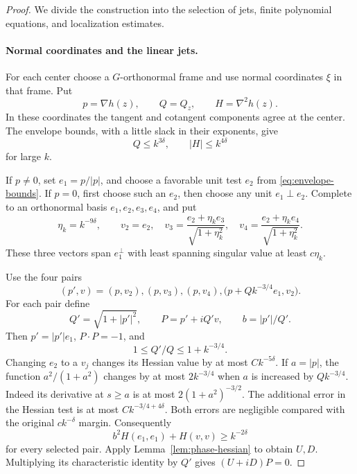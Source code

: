 \begin{proof}
We divide the construction into the selection of jets, finite
polynomial equations, and localization estimates.

\paragraph{Normal coordinates and the linear jets.}
For each center choose a \(G\)-orthonormal frame and use normal
coordinates \(\xi\) in that frame. Put
\[
 p=\nabla h(z),\qquad Q=Q_z,\qquad H=\nabla^2h(z).
\]
In these coordinates the tangent and cotangent components agree at
the center. The envelope bounds, with a little slack in their
exponents, give
\begin{equation}\label{eq:waves-center-bounds}
 Q\le k^{3\delta},\qquad |H|\le k^{4\delta}
\end{equation}
for large \(k\).

If \(p\ne0\), set \(e_1=p/|p|\), and choose a favorable unit test \(e_2\)
from \eqref{eq:envelope-bounds}. If \(p=0\), first choose such an
\(e_2\), then choose any unit \(e_1\perp e_2\).
Complete to an orthonormal basis \(e_1,e_2,e_3,e_4\), and put
\[
 \eta_k=k^{-9\delta},\qquad
 v_2=e_2,\quad
 v_3=\frac{e_2+\eta_k e_3}{\sqrt{1+\eta_k^2}},\quad
 v_4=\frac{e_2+\eta_k e_4}{\sqrt{1+\eta_k^2}}.
\]
These three vectors span \(e_1^\perp\) with least spanning singular
value at least \(c\eta_k\).

Use the four pairs
\[
 (p',v)=(p,v_2),(p,v_3),(p,v_4),
 \bigl(p+Qk^{-3/4}e_1,v_2\bigr).
\]
For each pair define
\[
 Q'=\sqrt{1+|p'|^2},\qquad P=p'+iQ'v,\qquad b=|p'|/Q'.
\]
Then \(p'=|p'|e_1\), \(P\cdot P=-1\), and
\begin{equation}\label{eq:waves-imaginary-size}
 1\le Q'/Q\le1+k^{-3/4}.
\end{equation}
Changing \(e_2\) to a \(v_j\) changes its Hessian value by at most
\(Ck^{-5\delta}\). If \(a=|p|\), the function \(a^2/(1+a^2)\)
changes by at most \(2k^{-3/4}\) when \(a\) is increased by
\(Qk^{-3/4}\). Indeed its derivative at \(s\ge a\) is at most
\(2(1+a^2)^{-3/2}\). The additional error in the Hessian test is
at most \(Ck^{-3/4+4\delta}\). Both errors are negligible compared
with the original \(ck^{-\delta}\) margin. Consequently
\[
 b^2H(e_1,e_1)+H(v,v)\ge k^{-2\delta}
\]
for every selected pair. Apply Lemma~\ref{lem:phase-hessian} to obtain
\(U,D\). Multiplying its characteristic identity by \(Q'\) gives
\((U+iD)P=0\).


\end{proof}

